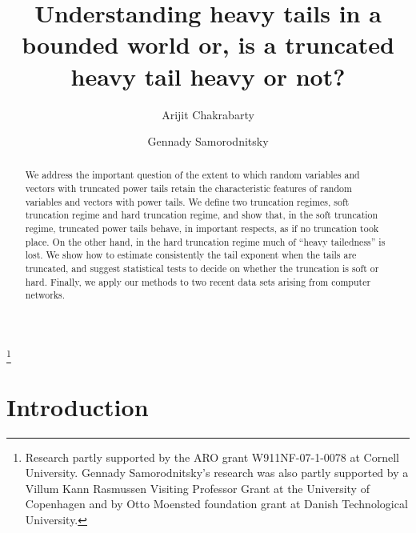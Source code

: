 \documentclass[11pt]{amsart}
\numberwithin{equation}{section}
\begin{document}
\title[Truncated heavy tails]{Understanding heavy tails in a bounded
world or, is a truncated heavy tail heavy or not?}
\author[A. Chakrabarty]{Arijit Chakrabarty}
\address{School of Operations Research and Information Engineering,
Cornell University,
Ithaca, NY 14853, U.S.A.}
\author[G. Samorodnitsky]{Gennady Samorodnitsky}
\address{School of Operations Research and Information Engineering,
Cornell University,
Ithaca, NY 14853, U.S.A.}

\begin{abstract}
We address the important question of the extent to which random
variables and vectors with truncated power tails retain the
characteristic features of random variables and vectors with power
tails. We define two truncation regimes,  soft truncation regime
and hard truncation regime, and show that, in the soft truncation
regime, truncated power tails behave, in important respects, as if
no truncation took place. On the other hand, in the hard truncation
regime much of ``heavy tailedness'' is lost. We show how to
estimate consistently the tail exponent when the tails are
truncated, and suggest statistical tests to decide on whether the
truncation is soft or hard. Finally, we apply our methods to two
recent data sets arising from computer networks.
\end{abstract}

\thanks{Research partly supported by the ARO grant W911NF-07-1-0078 at
Cornell University. Gennady Samorodnitsky's research  was also
partly supported by a Villum Kann Rasmussen Visiting Professor
Grant at the University of Copenhagen and by Otto Moensted foundation
grant at Danish Technological University.}

\maketitle

\section{Introduction} \label{sec:intro}
\end{document}
